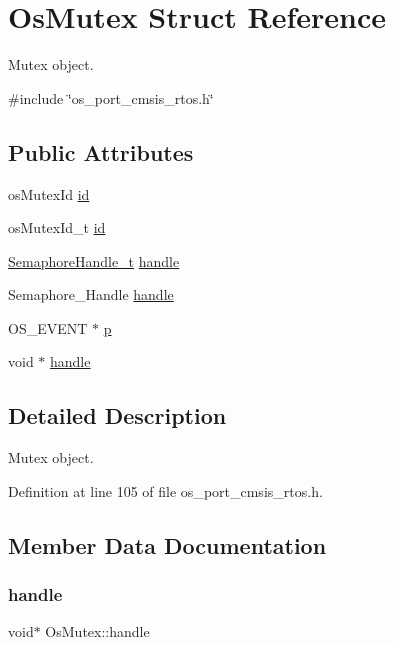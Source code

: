 \hypertarget{structOsMutex}{}\section{Os\+Mutex Struct Reference}
\label{structOsMutex}


Mutex object.  




{\ttfamily \#include \char`\"{}os\+\_\+port\+\_\+cmsis\+\_\+rtos.\+h\char`\"{}}

\subsection*{Public Attributes}
\begin{DoxyCompactItemize}
\item 
os\+Mutex\+Id \hyperlink{structOsMutex_ae52709d6235dc8132a937fe9a1518878}{id}
\item 
os\+Mutex\+Id\+\_\+t \hyperlink{structOsMutex_a58158c64389eba6006108f0ecb4578a8}{id}
\item 
\hyperlink{semphr_8h_ad88c6df4a04beedeac782918c8a332f5}{Semaphore\+Handle\+\_\+t} \hyperlink{structOsMutex_a6e65c1dc7f7a14067f7c8a9d7b646f07}{handle}
\item 
Semaphore\+\_\+\+Handle \hyperlink{structOsMutex_a3364c1497395134037e83e150bfc2757}{handle}
\item 
O\+S\+\_\+\+E\+V\+E\+NT $\ast$ \hyperlink{structOsMutex_a5e04eabc2ef39cfdb9fa3430136c777a}{p}
\item 
void $\ast$ \hyperlink{structOsMutex_a43f51853515297e027d644ad9dd6d9a3}{handle}
\end{DoxyCompactItemize}


\subsection{Detailed Description}
Mutex object. 

Definition at line 105 of file os\+\_\+port\+\_\+cmsis\+\_\+rtos.\+h.



\subsection{Member Data Documentation}
\mbox{\label{structOsMutex_a43f51853515297e027d644ad9dd6d9a3}} 
\subsubsection{\texorpdfstring{handle}{handle}\hspace{0.1cm}{\footnotesize\ttfamily [1/3]}}
{\footnotesize\ttfamily void$\ast$ Os\+Mutex\+::handle}



